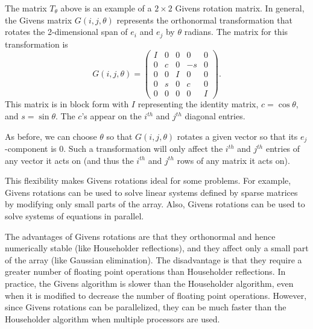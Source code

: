 The matrix $T_{\theta}$ above is an example of a $2 \times 2$ Givens rotation matrix. 
In general, the Givens matrix $G(i,j,\theta)$ represents the orthonormal transformation that rotates the 2-dimensional span of $e_i$ and $e_j$ by $\theta$ radians. 
The matrix for this transformation is
\begin{equation*}
G(i,j,\theta) = \begin{pmatrix}
I & 0 & 0 & 0 & 0 \\
0 & c & 0 & -s & 0 \\
0 & 0 & I & 0 & 0 \\
0 & s & 0 & c & 0 \\
0 & 0 & 0 & 0 & I
\end{pmatrix}.
\end{equation*}
This matrix is in block form with $I$ representing the identity matrix, $c=\cos \theta$, and $s=\sin \theta$. 
The $c$'s appear on the $i^{th}$ and $j^{th}$ diagonal entries. 

As before, we can choose $\theta$ so that $G(i,j,\theta)$ rotates a given vector so that its $e_j$-component is 0. 
Such a transformation will only affect the $i^{th}$ and $j^{th}$ entries of any vector it acts on (and thus the $i^{th}$ and $j^{th}$ rows of any matrix it acts on). 



This flexibility makes Givens rotations ideal for some problems.
For example, Givens rotations can be used to solve linear systems defined by sparse matrices by modifying only small parts of the array.
Also, Givens rotations can be used to solve systems of equations in parallel.

The advantages of Givens rotations are that they orthonormal and hence numerically stable (like Householder reflections), and they affect only a small part of the array (like Gaussian elimination).
The disadvantage is that they require a greater number of floating point operations than Householder reflections.
In practice, the Givens algorithm is slower than the Householder algorithm, even when it is modified to decrease the number of floating point operations. 
However, since Givens rotations can be parallelized, they can be much faster than the Householder algorithm when multiple processors are used.




